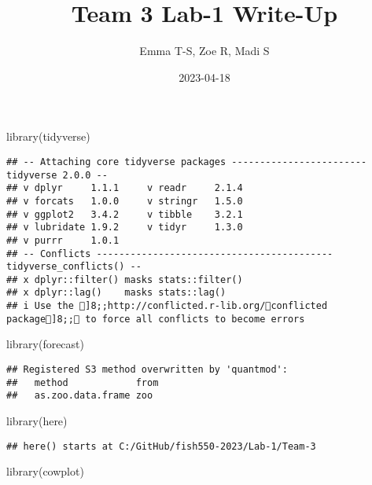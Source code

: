 \documentclass[
]{article}
\title{Team 3 Lab-1 Write-Up}
\author{Emma T-S, Zoe R, Madi S}
\date{2023-04-18}
\newenvironment{Shaded}{\begin{snugshade}}{\end{snugshade}}
\newcommand{\FunctionTok}[1]{\textcolor[rgb]{0.00,0.00,0.00}{#1}}
\newcommand{\NormalTok}[1]{#1}
\begin{document}
\maketitle

\begin{Shaded}
\begin{Highlighting}[]
\FunctionTok{library}\NormalTok{(tidyverse)}
\end{Highlighting}
\end{Shaded}

\begin{verbatim}
## -- Attaching core tidyverse packages ------------------------ tidyverse 2.0.0 --
## v dplyr     1.1.1     v readr     2.1.4
## v forcats   1.0.0     v stringr   1.5.0
## v ggplot2   3.4.2     v tibble    3.2.1
## v lubridate 1.9.2     v tidyr     1.3.0
## v purrr     1.0.1     
## -- Conflicts ------------------------------------------ tidyverse_conflicts() --
## x dplyr::filter() masks stats::filter()
## x dplyr::lag()    masks stats::lag()
## i Use the ]8;;http://conflicted.r-lib.org/conflicted package]8;; to force all conflicts to become errors
\end{verbatim}

\begin{Shaded}
\begin{Highlighting}[]
\FunctionTok{library}\NormalTok{(forecast)}
\end{Highlighting}
\end{Shaded}

\begin{verbatim}
## Registered S3 method overwritten by 'quantmod':
##   method            from
##   as.zoo.data.frame zoo
\end{verbatim}

\begin{Shaded}
\begin{Highlighting}[]
\FunctionTok{library}\NormalTok{(here)}
\end{Highlighting}
\end{Shaded}

\begin{verbatim}
## here() starts at C:/GitHub/fish550-2023/Lab-1/Team-3
\end{verbatim}

\begin{Shaded}
\begin{Highlighting}[]
\FunctionTok{library}\NormalTok{(cowplot)}
\end{Highlighting}
\end{Shaded}
\end{document}
